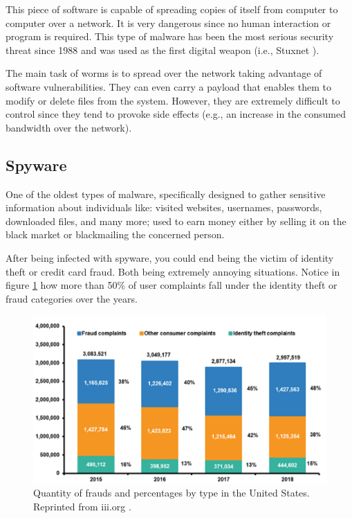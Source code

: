 \documentclass[11pt, a4paper,twoside]{tesi_upf}
\begin{document}
This piece of software is capable of spreading copies of itself from computer to computer over a network. It is very dangerous since no human interaction or program is required. This type of malware has been the most serious security threat since 1988 \cite{worm} and was used as the first digital weapon (i.e., Stuxnet \cite{stuxnet-book}).

The main task of worms is to spread over the network taking advantage of software vulnerabilities. They can even carry a payload that enables them to modify or delete files from the system. However, they are extremely difficult to control since they tend to provoke side effects (e.g., an increase in the consumed bandwidth over the network).

\subsection{Spyware}

One of the oldest types of malware, specifically designed to gather sensitive information about individuals like: visited websites, usernames, passwords, downloaded files, and many more; used to earn money either by selling it on the black market or blackmailing the concerned person.

After being infected with spyware, you could end being the victim of identity theft or credit card fraud. Both being extremely annoying situations. Notice in figure \ref{fig:fraud_figure} how more than 50\% of user complaints fall under the identity theft or fraud categories over the years.

\begin{figure}
    \centering
    \includegraphics[width=\linewidth]{images/fraud_victims.png}
    \caption{Quantity of frauds and percentages by type in the United States. Reprinted from iii.org 
    \cite{fraud_graph}.}
    \label{fig:fraud_figure}
\end{figure}
\end{document}
